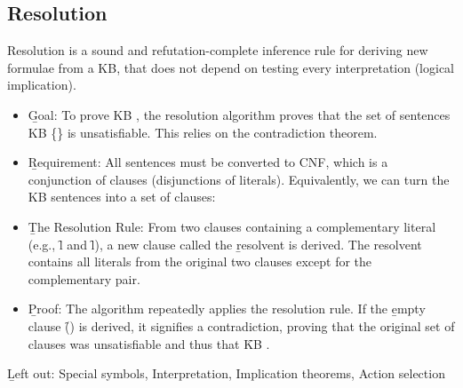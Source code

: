 \subsection{Resolution}
Resolution is a sound and refutation-complete inference rule for deriving new formulae from a KB, that does not depend on testing every interpretation (logical implication).
\begin{itemize}
    \item \b{Goal:} To prove \f{\textrm{KB} \models \alpha}, the resolution algorithm proves that the set of sentences \f{\textrm{KB} \cup \{\neg\alpha\}} is unsatisfiable. This relies on the contradiction theorem.
    \item \b{Requirement:} All sentences must be converted to CNF, which is a conjunction of clauses (disjunctions of literals). Equivalently, we can turn the KB sentences into a set of clauses: 
    \item \b{The Resolution Rule:} From two clauses containing a complementary literal (e.g., \f{l} and \f{\neg l}), a new clause called the \b{resolvent} is derived. The resolvent contains all literals from the original two clauses except for the complementary pair.
    \item \b{Proof:} The algorithm repeatedly applies the resolution rule. If the \b{empty clause} (\f{\Box}) is derived, it signifies a contradiction, proving that the original set of clauses was unsatisfiable and thus that \f{KB \models \alpha}.
\end{itemize}
\vspace{0.5em}
\b{Left out:} Special symbols, Interpretation, Implication theorems, Action selection